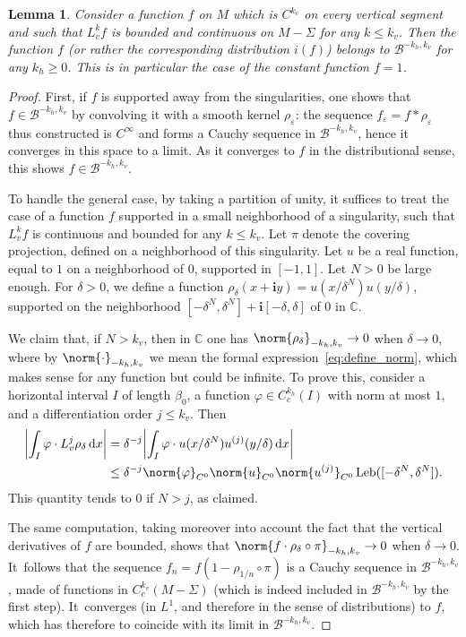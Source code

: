 \documentclass[JEP,XML,SOM,Unicode]{cedram}
\newcommand{\boB}{\mathcal{B}}
\newcommand{\CC}{\mathbb{C}}
\newcommand{\dd}{\mathop{}\!\mathrm{d}}
\newcommand{\ic}{\mathbf{i}}
\newcommand{\absgg}[1]{\biggl \lvert#1\biggr\rvert}
\DeclareMathOperator{\Leb}{Leb}
\let\epsilon\varepsilon
\let\phi\varphi
\newtheorem{lem}[thm]{Lemma}
\theoremstyle{definition}
\numberwithin{equation}{section}
\begin{document}
\begin{lem}
\label{lem:boB_riche} Consider a function $f$ on $M$ which is $C^{k_v}$ on
every vertical segment and such that $L_v^k f$ is bounded and continuous on
$M-\Sigma$ for any $k \leq k_v$. Then the function $f$ (or rather the
corresponding distribution $i(f)$) belongs to $\boB^{-k_h, k_v}$ for any
$k_h\geq 0$. This is in particular the case of the constant function $f=1$.
\end{lem}
\begin{proof}
First, if $f$ is supported away from the singularities, one shows that \hbox{$f \in
\boB^{-k_h, k_v}$} by convolving it with a smooth kernel $\rho_\epsilon$:
the sequence $f_\epsilon = f * \rho_\epsilon$ thus constructed is $C^\infty$ and forms
a Cauchy sequence in $\boB^{-k_h, k_v}$, hence it converges in this space to a limit.
As it converges to $f$ in the distributional sense, this shows $f \in \boB^{-k_h, k_v}$.

To handle the general case, by taking a partition of unity, it suffices to
treat the case of a function $f$ supported in a small neighborhood of a
singularity, such that $L_v^k f$ is continuous and bounded for any $k \leq
k_v$. Let $\pi$ denote the covering projection, defined on a neighborhood of
this singularity. Let $u$ be a real function, equal to $1$ on a neighborhood
of $0$, supported in $[-1,1]$. Let $N>0$ be large enough. For $\delta > 0$,
we define a function $\rho_\delta(x+ \ic y) = u(x/\delta^N) u(y/\delta)$,
supported on the neighborhood $[-\delta^N, \delta^N] + \ic [-\delta, \delta]$
of $0$ in $\CC$.

We claim that, if $N>k_v$, then in $\CC$ one has $\norm{\rho_\delta}_{-k_h,
k_v} \to 0$ when $\delta \to 0$, where by $\norm{\cdot}_{-k_h, k_v}$ we mean the formal
expression~\eqref{eq:define_norm}, which makes sense for any function but could be
infinite. To prove this, consider a horizontal
interval $I$ of length $\beta_0$, a function $\phi \in C_c^{k_h}(I)$ with
norm at most $1$, and a differentiation order $j \leq k_v$. Then
\begin{align*}
\absgg{\int_I \phi \cdot L_v^j \rho_\delta \dd x}
&= \delta^{-j} \absgg{\int_I \phi \cdot u(x/\delta^N) u^{(j)}(y/\delta) \dd x}
\\&\leq \delta^{-j} \norm{\phi}_{C^0} \norm{u}_{C^0} \norm{u^{(j)}}_{C^0} \Leb([-\delta^N, \delta^N]).
\end{align*}
This quantity tends to $0$ if $N>j$, as claimed.

The same computation, taking moreover into account the fact that the vertical
derivatives of $f$ are bounded, shows that $\norm{f \cdot \rho_\delta\circ
\pi}_{-k_h, k_v} \to 0$ when $\delta \to 0$. It~follows that the sequence
$f_n = f (1- \rho_{1/n} \circ \pi)$ is a Cauchy sequence in $\boB^{-k_h,
k_v}$, made of functions in $C^{k_v}_c(M-\Sigma)$ (which is indeed included
in $\boB^{-k_h, k_v}$ by the first step). It~converges (in $L^1$,
and therefore in the sense of distributions) to $f$, which has therefore to
coincide with its limit in $\boB^{-k_h, k_v}$.
\end{proof}
\end{document}
